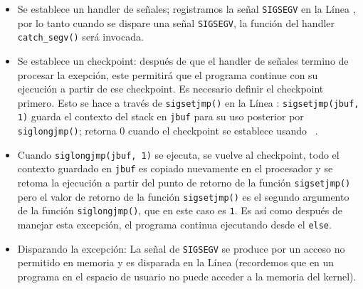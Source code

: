 \begin{itemize}
\item Se establece un handler de señales; registramos la señal \texttt{SIGSEGV} en la Línea , por lo tanto cuando se dispare una señal \texttt{SIGSEGV}, la función del handler \texttt{catch\_segv()} será invocada.

\item Se establece un checkpoint: después de que el handler de señales termino de procesar la exepción, este permitirá que el programa continue con su ejecución a partir de ese checkpoint. Es necesario definir el checkpoint primero. Esto se hace a través de \texttt{sigsetjmp()} en la Línea : 
\texttt{sigsetjmp(jbuf, 1)} guarda el contexto del stack en \texttt{jbuf} para su uso posterior por \texttt{siglongjmp()}; retorna 0 cuando el checkpoint se establece usando ~\cite{sigsetjmp}. 

\item Cuando \texttt{siglongjmp(jbuf, 1)} se ejecuta, se vuelve al checkpoint, todo el contexto guardado en \texttt{jbuf} es copiado nuevamente en el procesador y se retoma la ejecución a partir del punto de retorno de la función \texttt{sigsetjmp()} pero el valor de retorno de la función \texttt{sigsetjmp()} es el segundo argumento de la función \texttt{siglongjmp()}, que en este caso es \texttt{1}.
Es así como después de manejar esta excepción, el programa continua ejecutando desde el \texttt{else}.

\item Disparando la excepción: La señal de \texttt{SIGSEGV} se produce por un acceso no permitido en memoria y es disparada en la Línea  (recordemos que en un programa en el espacio de usuario no puede acceder a la memoria del kernel).

\end{itemize}



%

